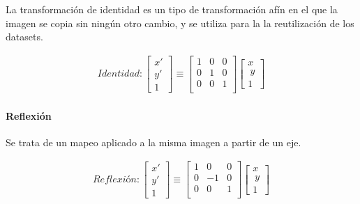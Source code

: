 La transformación de identidad es un tipo de transformación afín en el que la imagen se copia sin ningún otro cambio, y se utiliza para la  
la reutilización de los datasets.

\label{img:transformacion-identidad}

\begin{gather}
	Identidad:
	\begin{bmatrix} x' \\ y' \\ 1 \end{bmatrix}
	\equiv
	 \begin{bmatrix}
	  1 & 0 & 0 \\
	  0 & 1 & 0 \\
	  0 & 0 & 1 \\
	  \end{bmatrix}
	  \begin{bmatrix} x \\\ y \\ 1 \end{bmatrix}
\end{gather}


\paragraph{Reflexión}

Se trata de un mapeo aplicado a la misma imagen a partir de un eje.

\label{img:transformacion-reflejo}

\begin{gather}
	Reflexión:
	\begin{bmatrix} x' \\ y' \\ 1 \end{bmatrix}
	\equiv
	 \begin{bmatrix}
	  1 & 0 & 0 \\
	  0 & -1 & 0 \\
	  0 & 0 & 1 \\
	  \end{bmatrix}
	  \begin{bmatrix} x \\\ y \\ 1 \end{bmatrix}
\end{gather}

